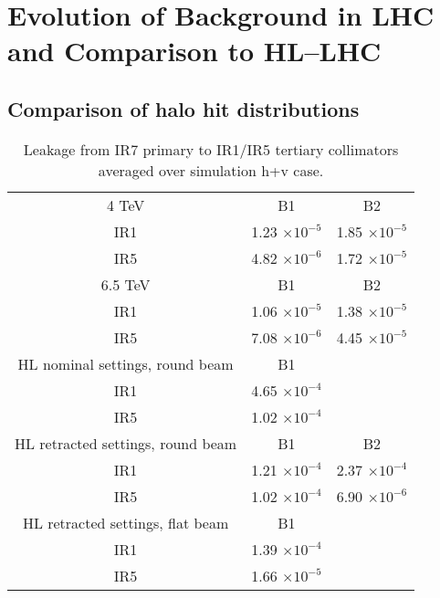\section{Evolution of Background in LHC and Comparison to HL--LHC\label{evolut}}

\subsection{Comparison of halo hit distributions}

\begin{table}%
   \centering
   \caption{Leakage from IR7 primary to IR1/IR5 tertiary collimators averaged over simulation h+v case.}

   \begin{tabular}{c|c|c}
       \hline
       4 TeV  & B1 & B2\\

       IR1 & 1.23 $\times 10^{-5}$ & 1.85 $\times 10^{-5}$  \\
       IR5 & 4.82 $\times 10^{-6}$ & 1.72 $\times 10^{-5}$  \\
       \hline
       6.5 TeV  & B1 & B2\\

       IR1 & 1.06 $\times 10^{-5}$ & 1.38 $\times 10^{-5}$  \\
       IR5 & 7.08 $\times 10^{-6}$ & 4.45 $\times 10^{-5}$  \\
       \hline       
       HL nominal settings, round beam  & B1 & \\ %
       
       IR1 & 4.65 $\times 10^{-4}$ &  \\ 
       IR5 & 1.02 $\times 10^{-4}$ &  \\ %
       \hline
       HL retracted settings, round beam  & B1 & B2 \\
       
       IR1 & 1.21 $\times 10^{-4}$ &  2.37 $\times 10^{-4}$ \\ %
       IR5 & 1.02 $\times 10^{-4}$ &  6.90 $\times 10^{-6}$ \\ %
       \hline

       HL retracted settings, flat beam  & B1 \\       
       IR1 & 1.39 $\times 10^{-4}$ & \\ %
       IR5 & 1.66 $\times 10^{-5}$ & \\ %
       \hline
   \end{tabular}
   \label{leakageFactors}
\end{table}



